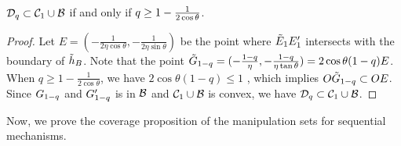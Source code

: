 \begin{lemma}\label{lmm:Dq < Cq+Bq when q is large}
   $\mathcal{D}_{q}\subset \mathcal{C}_{1}\cup \mathcal{B}$ if and only if $q\geq 1 - \frac{1}{2\cos{\theta}}$.
\end{lemma}

\begin{proof}
    Let $E = (-\frac{1}{2\eta\cos\theta}, -\frac{1}{2\eta\sin{\theta}})$ be the point where $\tilde {E}_{1} E_{1}'$ intersects with the boundary of $\tilde{h}_B$. Note that the point $\tilde {G}_{1-q} = (-\frac{1-q}{\eta},-\frac{1-q}{\eta\tan\theta}) = 2\cos \theta (1-q) E$. When $q \geq 1-\frac{1}{2\cos \theta}$, we have $2\cos \theta (1-q) \leq 1$ , which implies $O\tilde {G}_{1-q} \subset OE$.
    Since $G_{1-q}$ and $G_{1-q}'$ is in $\mathcal{B}$ and $\mathcal{C}_{1}\cup \mathcal{B}$ is convex, we have $\mathcal{D}_{q}\subset \mathcal{C}_{1}\cup \mathcal{B}$.
\end{proof} 


Now, we prove the coverage proposition of the manipulation sets for sequential mechanisms.

